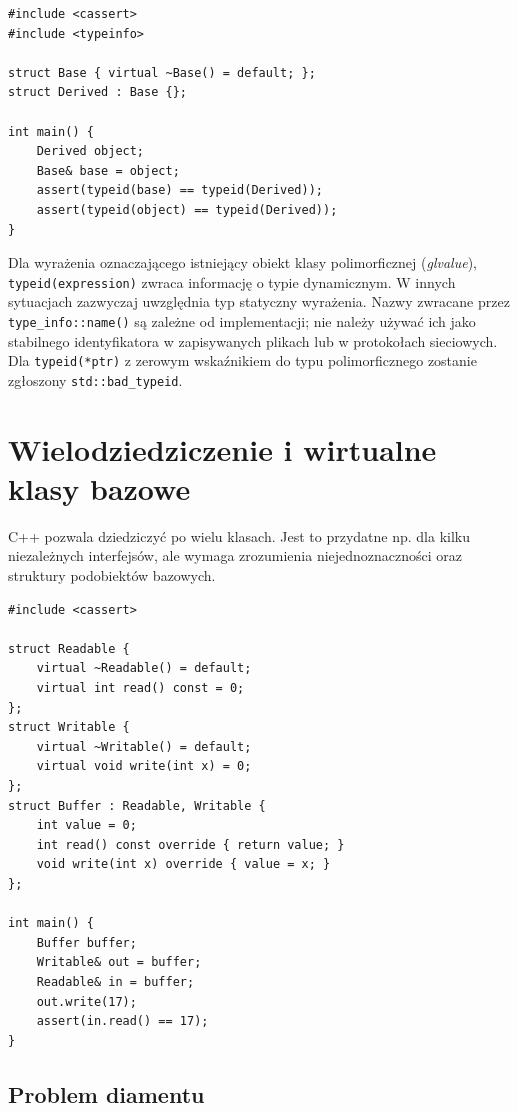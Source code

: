 \begin{lstlisting}[caption={Odczyt informacji o typie dynamicznym (C++11); kompletny program.}]
#include <cassert>
#include <typeinfo>

struct Base { virtual ~Base() = default; };
struct Derived : Base {};

int main() {
    Derived object;
    Base& base = object;
    assert(typeid(base) == typeid(Derived));
    assert(typeid(object) == typeid(Derived));
}
\end{lstlisting}

\noindent Dla wyrażenia oznaczającego istniejący obiekt klasy
polimorficznej (\emph{glvalue}),
\texttt{typeid(expression)} zwraca informację o typie dynamicznym.
W innych sytuacjach zazwyczaj uwzględnia typ statyczny wyrażenia.
Nazwy zwracane przez \texttt{type\_info::name()} są zależne
od implementacji; nie należy używać ich jako stabilnego identyfikatora
w zapisywanych plikach lub w protokołach sieciowych.
Dla \texttt{typeid(*ptr)} z zerowym wskaźnikiem do typu polimorficznego
zostanie zgłoszony \texttt{std::bad\_typeid}.

\section{Wielodziedziczenie i wirtualne klasy bazowe}
\label{sec:cpp12-multiple}

C++ pozwala dziedziczyć po wielu klasach. Jest to przydatne
np. dla kilku niezależnych interfejsów, ale wymaga zrozumienia
niejednoznaczności oraz struktury podobiektów bazowych.

\begin{lstlisting}[caption={Dwie niezależne bazy-interfejsy (C++11); kompletny program.}]
#include <cassert>

struct Readable {
    virtual ~Readable() = default;
    virtual int read() const = 0;
};
struct Writable {
    virtual ~Writable() = default;
    virtual void write(int x) = 0;
};
struct Buffer : Readable, Writable {
    int value = 0;
    int read() const override { return value; }
    void write(int x) override { value = x; }
};

int main() {
    Buffer buffer;
    Writable& out = buffer;
    Readable& in = buffer;
    out.write(17);
    assert(in.read() == 17);
}
\end{lstlisting}

\subsection{Problem diamentu}

